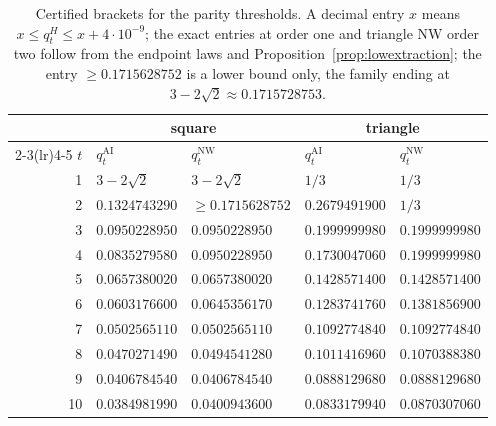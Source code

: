 \documentclass[11pt]{article}
\theoremstyle{plain}
\theoremstyle{definition}
\begin{document}
\begin{table}
\centering
\small
\renewcommand{\arraystretch}{1.15}
\begin{tabular}{r@{\quad}ll@{\qquad}ll}
\toprule
& \multicolumn{2}{c}{square} & \multicolumn{2}{c}{triangle}\\
\cmidrule(lr){2-3}\cmidrule(lr){4-5}
$t$ & $q^{\mathrm{AI}}_t$ & $q^{\mathrm{NW}}_t$ & $q^{\mathrm{AI}}_t$ & $q^{\mathrm{NW}}_t$\\
\midrule
1 & $3-2\sqrt2$ & $3-2\sqrt2$ & $1/3$ & $1/3$\\
2 & $0.1324743290$ & $\ge0.1715628752$ & $0.2679491900$ & $1/3$\\
3 & $0.0950228950$ & $0.0950228950$ & $0.1999999980$ & $0.1999999980$\\
4 & $0.0835279580$ & $0.0950228950$ & $0.1730047060$ & $0.1999999980$\\
5 & $0.0657380020$ & $0.0657380020$ & $0.1428571400$ & $0.1428571400$\\
6 & $0.0603176600$ & $0.0645356170$ & $0.1283741760$ & $0.1381856900$\\
7 & $0.0502565110$ & $0.0502565110$ & $0.1092774840$ & $0.1092774840$\\
8 & $0.0470271490$ & $0.0494541280$ & $0.1011416960$ & $0.1070388380$\\
9 & $0.0406784540$ & $0.0406784540$ & $0.0888129680$ & $0.0888129680$\\
10 & $0.0384981990$ & $0.0400943600$ & $0.0833179940$ & $0.0870307060$\\
\bottomrule
\end{tabular}
\caption{Certified brackets for the parity thresholds. A decimal entry $x$ means $x\le q^H_t\le x+4\cdot10^{-9}$; the exact entries at order one and triangle NW order two follow from the endpoint laws and Proposition~\ref{prop:lowextraction}; the entry $\ge0.1715628752$ is a lower bound only, the family ending at $3-2\sqrt2\approx0.1715728753$.}\label{tab:thresholds}
\end{table}
\end{document}
